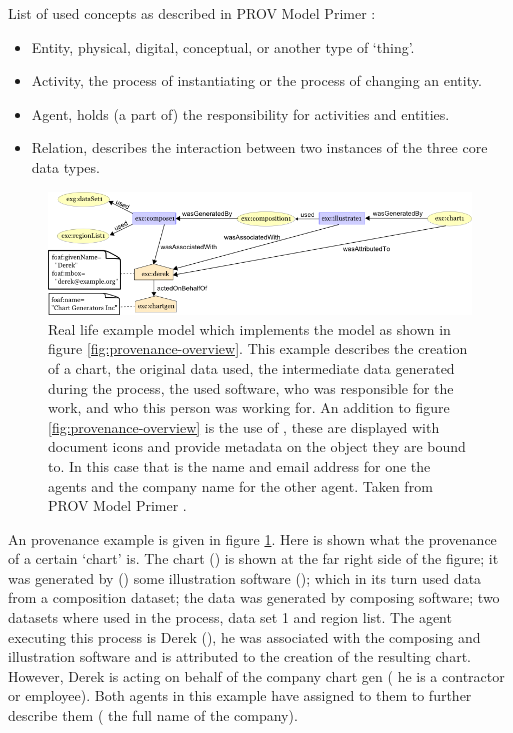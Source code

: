 List of used concepts as described in PROV Model Primer \cite{dsp8gil}:

\begin{itemize}
	\item Entity, physical, digital, conceptual, or another type of `thing'.
	\item Activity, the process of instantiating or the process of changing an entity.
	\item Agent, holds (a part of) the responsibility for activities and entities.
	\item Relation, describes the interaction between two instances of the three core data types.
\end{itemize}

\begin{figure}[!t]
	\centering
	\includegraphics[width=1.0\linewidth]{images/provenance-large-schema}
	\caption{
		Real life example model which implements the model as shown in figure \ref{fig:provenance-overview}.
		This example describes the creation of a chart, the original data used, the intermediate data generated during the process, the used software, who was responsible for the work, and who this person was working for.
		An addition to figure \ref{fig:provenance-overview} is the use of \attributes{}, these are displayed with document icons and provide metadata on the object they are bound to.
		In this case that is the name and email address for one the agents and the company name for the other agent.
		Taken from PROV Model Primer \cite{dsp8gil}.
		}
	\label{fig:provenance-large-schema}
\end{figure}

An provenance example is given in figure \ref{fig:provenance-large-schema}.
Here is shown what the provenance of a certain `chart' is.
The chart (\entity) is shown at the far right side of the figure; it was generated by (\relation) some illustration software (\activity); which in its turn used data from a composition dataset; the data was generated by composing software; two datasets where used in the process, data set 1 and region list.
The agent executing this process is Derek (\agent), he was associated with the composing and illustration software and is attributed to the creation of the resulting chart.
However, Derek is acting on behalf of the company chart gen (\eg{} he is a contractor or employee).
Both agents in this example have \attributes{} assigned to them to further describe them (\eg{} the full name of the company).




